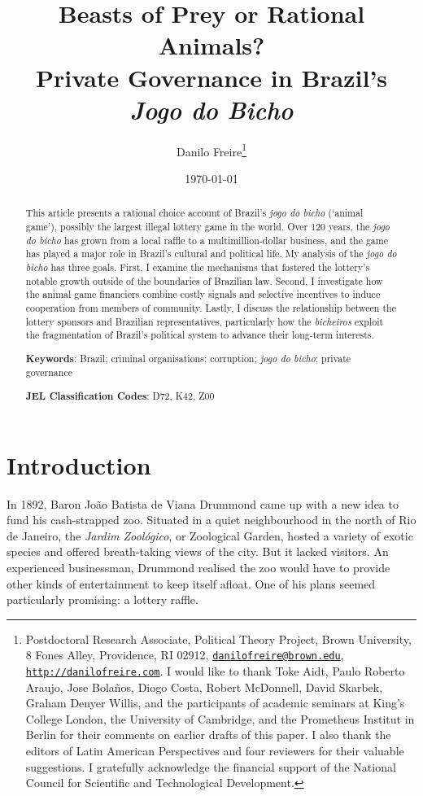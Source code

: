 \documentclass[a4paper,12pt]{article}
\title{\textbf{Beasts of Prey or Rational Animals?\\ Private Governance in Brazil's \textit{Jogo do Bicho}}}
\author{Danilo Freire\thanks{Postdoctoral Research Associate, Political Theory Project, Brown University, 8 Fones Alley, Providence, RI 02912, \href{mailto:danilofreire@brown.edu}{\texttt{danilofreire@brown.edu}}, \href{http://danilofreire.com}{\texttt{http://danilofreire.com}}. I would like to thank Toke Aidt, Paulo Roberto Araujo, Jose Bolaños, Diogo Costa, Robert McDonnell, David Skarbek, Graham Denyer Willis, and the participants of academic seminars at King's College London, the University of Cambridge, and the Prometheus Institut in Berlin for their comments on earlier drafts of this paper. I also thank the editors of Latin American Perspectives and four reviewers for their valuable suggestions. I gratefully acknowledge the financial support of the National Council for Scientific and Technological Development.}
}
\date{\today}
\begin{document}
\maketitle
\begin{abstract}
\noindent
This article presents a rational choice account of Brazil's \textit{jogo do bicho} (`animal game'), possibly the largest illegal lottery game in the world. Over 120 years, the \textit{jogo do bicho} has grown from a local raffle to a multimillion-dollar business, and the game has played a major role in Brazil's cultural and political life. My analysis of the \textit{jogo do bicho} has three goals. First, I examine the mechanisms that fostered the lottery's notable growth outside of the boundaries of Brazilian law. Second, I investigate how the animal game financiers combine costly signals and selective incentives to induce cooperation from members of community. Lastly, I discuss the relationship between the lottery sponsors and Brazilian representatives, particularly how the \textit{bicheiros} exploit the fragmentation of Brazil's political system to advance their long-term interests. 

 \vspace{.5cm}
 \noindent
 \textbf{Keywords}: Brazil; criminal organisations; corruption; \textit{jogo do bicho}; private governance
  
 \vspace{.25cm}
 \noindent
 \textbf{JEL Classification Codes}: D72, K42, Z00
\end{abstract}

\newpage

\section{Introduction}%
\label{sec:intro}

In 1892, Baron João Batista de Viana Drummond came up with a new idea to fund his cash-strapped zoo. Situated in a quiet neighbourhood in the north of Rio de Janeiro, the \textit{Jardim Zoológico}, or Zoological Garden, hosted a variety of exotic species and offered breath-taking views of the city. But it lacked visitors. An experienced businessman, Drummond realised the zoo would have to provide other kinds of entertainment to keep itself afloat. One of his plans seemed particularly promising: a lottery raffle.
\end{document}
